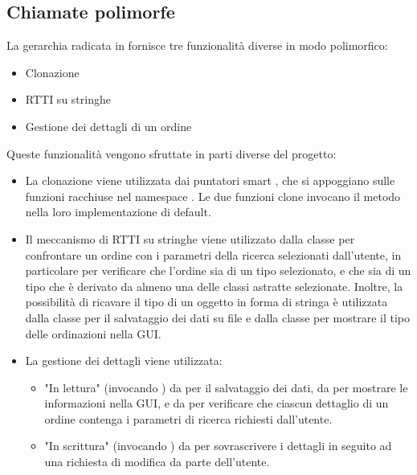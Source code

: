\subsection{Chiamate polimorfe} %
\label{sub:chiamate_polimorfe}
La gerarchia radicata in  fornisce tre funzionalità diverse in modo polimorfico:
\begin{itemize}
	\item Clonazione
	\item RTTI su stringhe
	\item Gestione dei dettagli di un ordine
\end{itemize}
Queste funzionalità vengono sfruttate in parti diverse del progetto:
\begin{itemize}
	\item La clonazione viene utilizzata dai puntatori smart , che si appoggiano sulle funzioni racchiuse nel namespace . Le due funzioni clone invocano il metodo  nella loro implementazione di default.
	\item Il meccanismo di RTTI su stringhe viene utilizzato dalla classe  per confrontare un ordine con i parametri della ricerca selezionati dall'utente, in particolare per verificare che l'ordine sia di un tipo selezionato, e che sia di un tipo che è derivato da almeno una delle classi astratte selezionate. Inoltre, la possibilità di ricavare il tipo di un oggetto in forma di stringa è utilizzata dalla classe  per il salvataggio dei dati su file e dalla classe  per mostrare il tipo delle ordinazioni nella GUI.
	\item La gestione dei dettagli viene utilizzata:
	\begin{itemize}
		\item "In lettura" (invocando ) da  per il salvataggio dei dati, da  per mostrare le informazioni nella GUI, e da  per verificare che ciascun dettaglio di un ordine contenga i parametri di ricerca richiesti dall'utente.
		\item "In scrittura" (invocando ) da  per sovrascrivere i dettagli in seguito ad una richiesta di modifica da parte dell'utente.
	\end{itemize}
\end{itemize}
